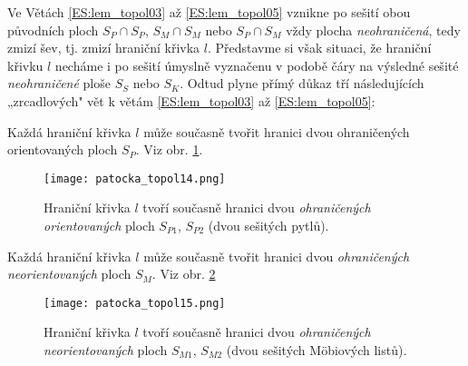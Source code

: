       Ve Větách \ref{ES:lem_topol03} až \ref{ES:lem_topol05} vznikne po sešití obou původních ploch 
      \(S_P\cap S_P\), \(S_M\cap S_M\) nebo \(S_P\cap S_M\) vždy plocha \emph{neohraničená}, tedy 
      zmizí šev, tj. zmizí hraniční křivka \(l\). Představme si však situaci, že hraniční křivku 
      \(l\) necháme i po sešití úmyslně vyznačenu v podobě čáry na výsledné sešité 
      \emph{neohraničené} ploše \(S_S\) nebo \(S_K\). Odtud plyne přímý důkaz tří následujících 
      „zrcadlových" vět k větám \ref{ES:lem_topol03} až \ref{ES:lem_topol05}:
    
      \begin{lemma}\label{ES:lem_topol06}
        Každá hraniční křivka \(l\) může současně tvořit hranici dvou ohraničených orientovaných 
        ploch \(S_P\). Viz obr. \ref{es:fig_patocka_topol14}.
        \begin{figure}[ht!]
          \centering  
          \texttt{[image: patocka\_topol14.png]}
          \caption{Hraniční křivka \(l\) tvoří současně hranici dvou \emph{ohraničených 
                   orientovaných} ploch \(S_{P1}\), \(S_{P2}\) (dvou sešitých 
                   pytlů).\cite[s.~55]{Patocka4}} 
          \label{es:fig_patocka_topol14}
        \end{figure}
      \end{lemma}
      
      \begin{lemma}\label{ES:lem_topol07}
        Každá hraniční křivka \(l\) může současně tvořit hranici dvou \emph{ohraničených 
        neorientovaných} ploch \(S_M\). Viz obr. \ref{es:fig_patocka_topol15}
        \begin{figure}[ht!]
          \centering  
          \texttt{[image: patocka\_topol15.png]}
          \caption{Hraniční křivka \(l\) tvoří současně hranici dvou \emph{ohraničených 
                   neorientovaných} ploch \(S_{M1}\), \(S_{M2}\) (dvou sešitých Möbiových 
                   listů).\cite[s.~55]{Patocka4}} 
          \label{es:fig_patocka_topol15}
        \end{figure}
      \end{lemma}

